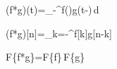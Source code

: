 (f*g)(t)=\int_{-\infty}^{\infty}f(\tau)g(t-\tau)\,d\tau

(f*g)[n]=\sum_{k=-\infty}^{\infty}f[k]g[n-k]

\mathcal F\{f*g\}=\mathcal F\{f\}\,\mathcal F\{g\}

